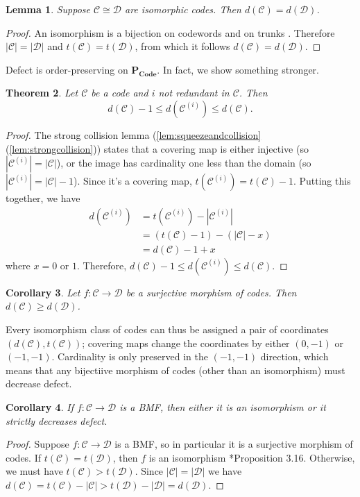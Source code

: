 \documentclass[11pt,letterpaper, reqno]{amsart}
\newtheorem{thm}{Theorem}[section]   %
\newtheorem{cor}[thm]{Corollary}     %
\newtheorem{lem}[thm]{Lemma}         %
\theoremstyle{definition}
\def\cC{\mathcal{C}}
\def\cD{\mathcal{D}}
\def\pcode{\mathbf{P_{Code}}}
\begin{document}
        \begin{lem}
            Suppose $\cC \cong \cD$ are isomorphic codes. Then $d(\cC) = d(\cD)$.
        \end{lem}
        \begin{proof}
            An isomorphism is a bijection on codewords and on trunks \cite{jeffs2019sunflowers}. Therefore $|\cC| = |\cD|$ and $t(\cC) = t(\cD)$, from which it follows $d(\cC) = d(\cD)$.
        \end{proof}
        Defect is order-preserving on $\pcode$. In fact, we show something stronger.
        

        \begin{thm}\label{thm:bigrading}
            Let $\cC$ be a code and $i$ not redundant in $\cC$. Then 
            \[d(\cC) - 1 \leq d(\cC^{(i)}) \leq d(\cC).\]
        \end{thm}
        
        \begin{proof}
            The strong collision lemma (\cref{lem:squeezeandcollision}(\ref{lem:strongcollision})) states that a covering map is either injective (so $|\cC^{(i)}| = |\cC|$), or the image has cardinality one less than the domain (so $|\cC^{(i)}| = |\cC| - 1$).
            Since it's a covering map, $t(\cC^{(i)}) = t(\cC) - 1$.
            Putting this together, we have
            \begin{align*}
                d(\cC^{(i)}) & = t(\cC^{(i)}) -|\cC^{(i)}|\\
                    & = (t(\cC) - 1) - (|\cC| - x)\\
                    & = d(\cC) - 1 + x
            \end{align*}
            where $x = 0$ or $1$.
            Therefore, $d(\cC) - 1 \leq d(\cC^{(i)}) \leq d(\cC)$.
        \end{proof}
        \begin{cor}
            Let $f: \cC \to \cD$ be a surjective morphism of codes.
            Then $d(\cC) \geq d(\cD)$.
        \end{cor}

        Every isomorphism class of codes can thus be assigned a pair of coordinates $(d(\cC), t(\cC))$; covering maps change the coordinates by either  $(0,-1)$ or $(-1,-1)$. Cardinality is only preserved in the $(-1,-1)$ direction, which means that any bijectiive morphism of codes (other than an isomorphism) must decrease defect.

        \begin{cor}\label{cor:BMFdefect}
            If $f: \cC \to \cD$ is a BMF, then either it is an isomorphism or it strictly decreases defect.
        \end{cor}
        \begin{proof}
            Suppose $f:\cC\to\cD$ is a BMF, so in particular it is a surjective morphism of codes.
            If $t(\cC) = t(\cD)$, then $f$ is an isomorphism \cite{jeffs2019sunflowers}*{Proposition 3.16}.            
            Otherwise, we must have $t(\cC) > t(\cD)$. Since $|\cC| = |\cD|$ we have $d(\cC) = t(\cC) - |\cC| > t(\cD) - |\cD| = d(\cD)$.
        \end{proof}
\end{document}
